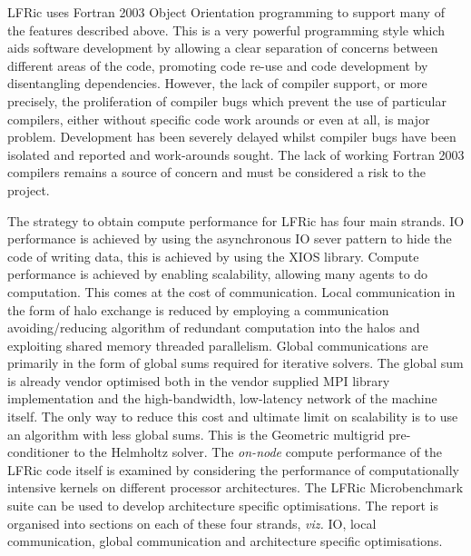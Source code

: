 \documentclass[11pt]{article}
\begin{document}
LFRic uses Fortran 2003 Object Orientation programming to support many of the
features described above. This is a very powerful programming
style which aids software development by allowing a clear separation
of concerns between different areas of the code, promoting code re-use
and code development by disentangling dependencies. However, the lack
of compiler support, or more precisely, the proliferation of compiler
bugs which prevent the use of particular compilers, either without specific
code work arounds or even at all, is major problem. Development has
been severely delayed whilst compiler bugs have been isolated and
reported and work-arounds sought. The lack of working Fortran 2003
compilers remains a source of concern and must be considered a risk to
the project.

The strategy to obtain compute performance for LFRic has four main
strands. IO performance is achieved by using the asynchronous IO sever
pattern to hide the code of writing data, this is achieved by using
the XIOS library. Compute performance is achieved by enabling
scalability, allowing many agents to do computation. This comes at the
cost of communication. Local communication in the form of halo
exchange is reduced by employing a communication avoiding/reducing
algorithm of redundant computation into the halos and exploiting shared
memory threaded parallelism. Global communications are primarily in
the form of global sums required for iterative solvers. The global sum
is already vendor optimised both in the vendor supplied MPI library
implementation and the high-bandwidth, low-latency network of the
machine itself. The only way to reduce this cost and ultimate limit on
scalability is to use an algorithm with less global sums. This is the
Geometric multigrid pre-conditioner to the Helmholtz solver. The {\em
  on-node} compute performance of the LFRic code itself is examined by
considering the performance of computationally intensive kernels on
different processor architectures. The LFRic Microbenchmark suite can
be used to develop architecture specific optimisations.
The report is organised into sections on each of these four strands,
{\em viz.} IO, local communication, global communication and
architecture specific optimisations.








\end{document}
